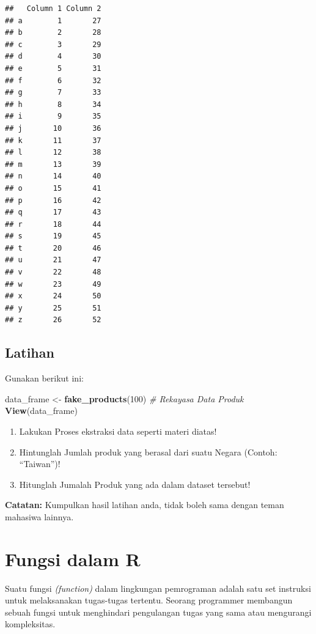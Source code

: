 \documentclass[
]{book}
\newenvironment{Shaded}{\begin{snugshade}}{\end{snugshade}}
\newcommand{\CommentTok}[1]{\textcolor[rgb]{0.56,0.35,0.01}{\textit{#1}}}
\newcommand{\DecValTok}[1]{\textcolor[rgb]{0.00,0.00,0.81}{#1}}
\newcommand{\FunctionTok}[1]{\textcolor[rgb]{0.13,0.29,0.53}{\textbf{#1}}}
\newcommand{\NormalTok}[1]{#1}
\newcommand{\OtherTok}[1]{\textcolor[rgb]{0.56,0.35,0.01}{#1}}
\providecommand{\tightlist}{%
  \setlength{\itemsep}{0pt}\setlength{\parskip}{0pt}}
\begin{document}
\begin{verbatim}
##   Column 1 Column 2
## a        1       27
## b        2       28
## c        3       29
## d        4       30
## e        5       31
## f        6       32
## g        7       33
## h        8       34
## i        9       35
## j       10       36
## k       11       37
## l       12       38
## m       13       39
## n       14       40
## o       15       41
## p       16       42
## q       17       43
## r       18       44
## s       19       45
## t       20       46
## u       21       47
## v       22       48
## w       23       49
## x       24       50
## y       25       51
## z       26       52
\end{verbatim}

\hypertarget{latihan-2}{%
\section{Latihan}\label{latihan-2}}

Gunakan berikut ini:

\begin{Shaded}
\begin{Highlighting}[]
\NormalTok{data\_frame }\OtherTok{\textless{}{-}} \FunctionTok{fake\_products}\NormalTok{(}\DecValTok{100}\NormalTok{)         }\CommentTok{\# Rekayasa Data Produk }
\FunctionTok{View}\NormalTok{(data\_frame)}
\end{Highlighting}
\end{Shaded}

\begin{enumerate}
\def\labelenumi{\arabic{enumi}.}
\tightlist
\item
  Lakukan Proses ekstraksi data seperti materi diatas!
\item
  Hintunglah Jumlah produk yang berasal dari suatu Negara (Contoh: ``Taiwan'')!
\item
  Hitunglah Jumalah Produk yang ada dalam dataset tersebut!
\end{enumerate}

\textbf{Catatan:} Kumpulkan hasil latihan anda, tidak boleh sama dengan teman mahasiwa lainnya.

\hypertarget{fungsi-dalam-r}{%
\chapter{Fungsi dalam R}\label{fungsi-dalam-r}}

Suatu fungsi \emph{(function)} dalam lingkungan pemrograman adalah satu set instruksi untuk melaksanakan tugas-tugas tertentu. Seorang programmer membangun sebuah fungsi untuk menghindari pengulangan tugas yang sama atau mengurangi kompleksitas.
\end{document}
